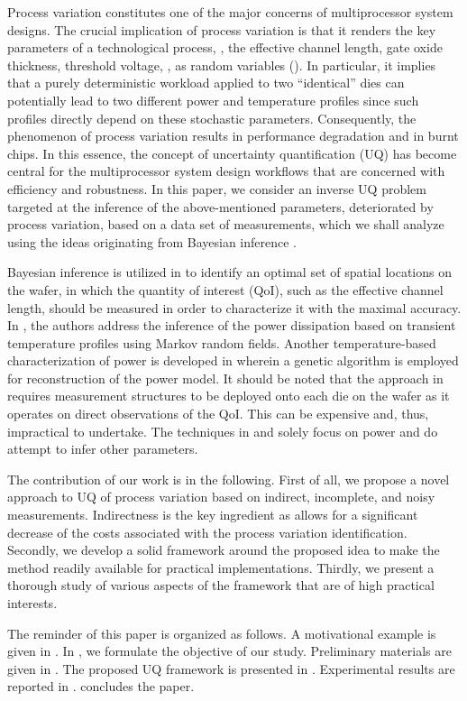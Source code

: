 Process variation constitutes one of the major concerns of multiprocessor system designs. The crucial implication of process variation is that it renders the key parameters of a technological process, \eg, the effective channel length, gate oxide thickness, threshold voltage, \etc, as random variables (\rvs). In particular, it implies that a purely deterministic workload applied to two ``identical'' dies can potentially lead to two different power and temperature profiles since such profiles directly depend on these stochastic parameters. Consequently, the phenomenon of process variation results in performance degradation and in burnt chips. In this essence, the concept of uncertainty quantification (UQ) has become central for the multiprocessor system design workflows that are concerned with efficiency and robustness. In this paper, we consider an inverse UQ problem targeted at the inference of the above-mentioned parameters, deteriorated by process variation, based on a data set of measurements, which we shall analyze using the ideas originating from Bayesian inference \cite{gelman2004}.

Bayesian inference is utilized in \cite{zhang2010} to identify an optimal set of spatial locations on the wafer, in which the quantity of interest (QoI), such as the effective channel length, should be measured in order to characterize it with the maximal accuracy. In \cite{paek2012}, the authors address the inference of the power dissipation based on transient temperature profiles using Markov random fields. Another temperature-based characterization of power is developed in \cite{mesa-martinez2007} wherein a genetic algorithm is employed for reconstruction of the power model. It should be noted that the approach in \cite{zhang2010} requires measurement structures to be deployed onto each die on the wafer as it operates on direct observations of the QoI. This can be expensive and, thus, impractical to undertake. The techniques in \cite{paek2012} and \cite{mesa-martinez2007} solely focus on power and do attempt to infer other parameters.

The contribution of our work is in the following. First of all, we propose a novel approach to UQ of process variation based on indirect, incomplete, and noisy measurements. Indirectness is the key ingredient as allows for a significant decrease of the costs associated with the process variation identification. Secondly, we develop a solid framework around the proposed idea to make the method readily available for practical implementations. Thirdly, we present a thorough study of various aspects of the framework that are of high practical interests.

The reminder of this paper is organized as follows. A motivational example is given in . In , we formulate the objective of our study. Preliminary materials are given in . The proposed UQ framework is presented in . Experimental results are reported in .  concludes the paper.
